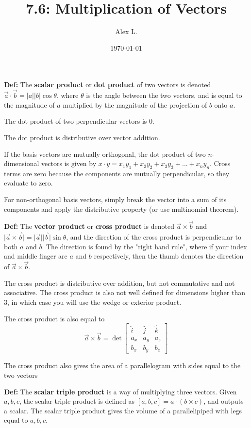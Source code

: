 \documentclass{article}
\title{7.6: Multiplication of Vectors}
\author{Alex L.}
\date{\today}
\begin{document}
\maketitle
\textbf{Def:} The \textbf{scalar product} or \textbf{dot product} of two vectors is denoted $\vec{a} \cdot \vec{b} = \vert a\vert \vert b\vert \cos\theta$, where $\theta$ is the angle between the two vectors, and is equal to the magnitude of $a$ multiplied by the magnitude of the projection of $b$ onto $a$.

The dot product of two perpendicular vectors is $0$. 

The dot product is distributive over vector addition.

If the basis vectors are mutually orthogonal, the dot product of two $n$-dimensional vectors is given by $x\cdot y = x_1y_1 + x_2y_2 + x_3y_3 + ... + x_ny_n$. Cross terms are zero because the components are mutually perpendicular, so they evaluate to zero. 

For non-orthogonal basis vectors, simply break the vector into a sum of its components and apply the distributive property (or use multinomial theorem).

\textbf{Def:} The \textbf{vector product} or \textbf{cross product} is denoted $\vec{a} \times \vec{b}$ and $\vert \vec{a} \times \vec{b} \vert = \vert \vec{a}\vert\vert\vec{b}\vert\sin\theta$, and the direction of the cross product is perpendicular to both $a$ and $b$. The direction is found by the "right hand rule", where if your index and middle finger are $a$ and $b$ respectively, then the thumb denotes the direction of $\vec{a} \times \vec{b}$. 

The cross product is distributive over addition, but not commutative and not associative. The cross product is also not well defined for dimensions higher than 3, in which case you will use the wedge or exterior product. 

The cross product is also equal to $$\vec{a} \times \vec{b} = \det \begin{bmatrix}
\hat{i} & \hat{j} & \hat{k} \\
a_x & a_y & a_z \\
b_x & b_y & b_z
\end{bmatrix}$$

The cross product also gives the area of a parallelogram with sides equal to the two vectors

\textbf{Def:} The \textbf{scalar triple product} is a way of multiplying three vectors. Given $a,b,c$, the scalar triple product is defined as $[a,b,c] = a\cdot(b\times c)$, and outputs a scalar. The scalar triple product gives the volume of a parallelipiped with legs equal to $a,b,c$. 
\end{document}
